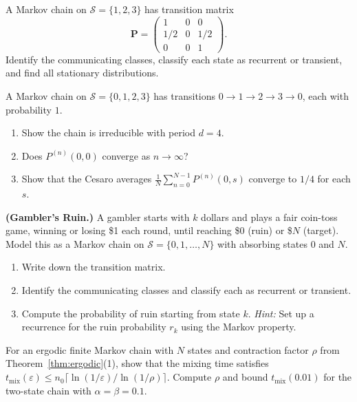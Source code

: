 \documentclass[11pt,a4paper]{article}
\begin{document}
\begin{exercise}[(*)]
\label{ex:absorbing}
A Markov chain on $\mathcal{S} = \{1, 2, 3\}$ has transition
matrix
\[
  \mathbf{P} = \begin{pmatrix}
    1 & 0 & 0 \\
    1/2 & 0 & 1/2 \\
    0 & 0 & 1
  \end{pmatrix}.
\]
Identify the communicating classes, classify each state as
recurrent or transient, and find all stationary distributions.
\end{exercise}

\begin{exercise}[(**)]
\label{ex:period}
A Markov chain on $\mathcal{S} = \{0, 1, 2, 3\}$ has transitions
$0 \to 1 \to 2 \to 3 \to 0$, each with probability $1$.
\begin{enumerate}[label=(\alph*)]
  \item Show the chain is irreducible with period $d = 4$.
  \item Does $P^{(n)}(0, 0)$ converge as $n \to \infty$?
  \item Show that the Cesaro averages
    $\frac{1}{N}\sum_{n=0}^{N-1} P^{(n)}(0, s)$ converge to
    $1/4$ for each $s$.
\end{enumerate}
\end{exercise}

\begin{exercise}[(**)]
\label{ex:gambler_ruin}
\textbf{(Gambler's Ruin.)}
A gambler starts with $k$ dollars and plays a fair coin-toss
game, winning or losing \$1 each round, until reaching \$0
(ruin) or \$$N$ (target).  Model this as a Markov chain on
$\mathcal{S} = \{0, 1, \ldots, N\}$ with absorbing states
$0$ and $N$.
\begin{enumerate}[label=(\alph*)]
  \item Write down the transition matrix.
  \item Identify the communicating classes and classify each as
    recurrent or transient.
  \item Compute the probability of ruin starting from state $k$.
    \textit{Hint:} Set up a recurrence for the ruin probability
    $r_k$ using the Markov property.
\end{enumerate}
\end{exercise}

\begin{exercise}[(***)]
\label{ex:ergodic_rate}
For an ergodic finite Markov chain with $N$ states and
contraction factor $\rho$ from Theorem~\ref{thm:ergodic}(1),
show that the mixing time satisfies
$t_{\text{mix}}(\varepsilon) \leq n_0 \lceil
\ln(1/\varepsilon) / \ln(1/\rho) \rceil$.
Compute $\rho$ and bound $t_{\text{mix}}(0.01)$ for the
two-state chain with $\alpha = \beta = 0.1$.
\end{exercise}
\end{document}

